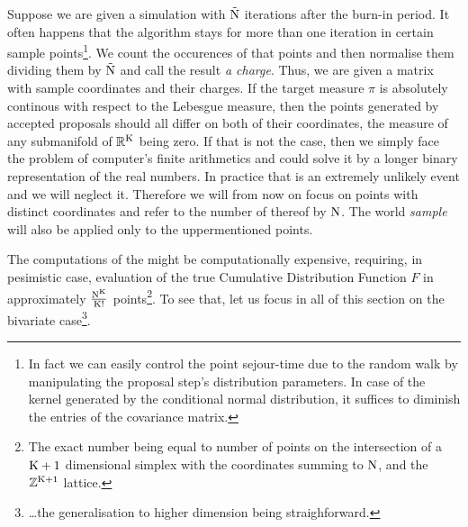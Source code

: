 \documentclass{book}
\begin{document}
Suppose we are given a simulation with $\tilde{\mathrm{N}}$ iterations after the burn-in period. It often happens that the algorithm stays for more than one iteration in certain sample points\footnote{In fact we can easily control the point sejour-time due to the random walk by manipulating the proposal step's distribution parameters. In case of the kernel generated by the conditional normal distribution, it suffices to diminish the entries of the covariance matrix.}. We count the occurences of that points and then normalise them dividing them by $\tilde{\mathrm{N}}$ and call the result {\it a charge}. Thus, we are given a matrix with sample coordinates and their charges. If the target measure $\pi$ is absolutely continous with respect to the Lebesgue measure, then the points generated by accepted proposals should all differ on both of their coordinates, the measure of any submanifold of $\mathbb{R}^{\mathrm{K}}$ being zero. If that is not the case, then we simply face the problem of computer's finite arithmetics and could solve it by a longer binary representation of the real numbers. In practice that is an extremely unlikely event and we will neglect it. Therefore we will from now on focus on points with distinct coordinates and refer to the number of thereof by $\mathrm{N}$. The world {\it sample} will also be applied only to the uppermentioned points. 

The computations of the \KS might be computationally expensive, requiring, in pesimistic case, evaluation of the true Cumulative Distribution Function $F$ in approximately $\frac{\mathrm{N}^{\mathrm{K}}}{\mathrm{K}!}$ points\footnote{The exact number being equal to number of points on the intersection of a $\mathrm{K}+1$ dimensional simplex with the coordinates summing to $\mathrm{N}$, and the $\mathbb{Z}^{\mathrm{K}+1}$ lattice.}. To see that, let us focus in all of this section on the bivariate case\footnote{\dots the generalisation to higher dimension being straighforward.}.   
\end{document}

